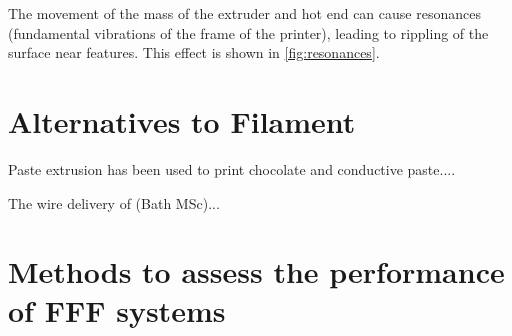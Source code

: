 % 

The movement of the mass of the extruder and hot end can cause resonances (fundamental vibrations of the frame of the printer), leading to rippling of the surface near features. This effect is shown in \ref{fig:resonances}. 


\section{Alternatives to Filament}

Paste extrusion has been used to print chocolate and conductive paste....

The wire delivery of (Bath MSc)...

\section{Methods to assess the performance of FFF systems}



